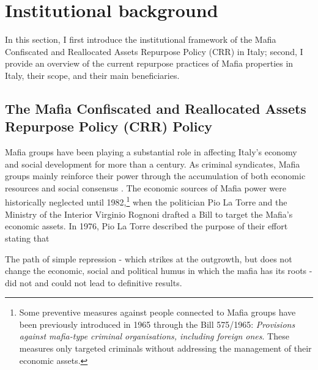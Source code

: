 \documentclass[12pt]{article}
\theoremstyle{plain}
\theoremstyle{plain}
\theoremstyle{plain}
\theoremstyle{definition}
\theoremstyle{plain}
\theoremstyle{definition}
\theoremstyle{plain}
\theoremstyle{remark}
\theoremstyle{definition}
\theoremstyle{definition}
\theoremstyle{plain}
\begin{document}
\section{Institutional background}
\label{sec:jmp_inst_bg}
In this section, I first introduce the institutional framework of the Mafia Confiscated and Reallocated Assets Repurpose Policy (CRR) in Italy; second, I provide an overview of the current repurpose practices of Mafia properties in Italy, their scope, and their main beneficiaries. \par
\FloatBarrier
\subsection{The Mafia Confiscated and Reallocated Assets Repurpose Policy (CRR) Policy}
\label{sec:jmp_crr_policy}
Mafia groups have been playing a substantial role in affecting Italy's economy and social development for more than a century. As criminal syndicates, Mafia groups mainly reinforce their power through the accumulation of both economic resources and social consensus \citep{sciarrone_il_1998}. 
The economic sources of Mafia power were historically neglected until 1982,\footnote{Some preventive measures against people connected to Mafia groups have been previously introduced in 1965 through the Bill 575/1965: \emph{Provisions against mafia-type criminal organisations, including foreign ones}. These measures only targeted criminals without addressing the management of their economic assets.} when the politician Pio La Torre and the Ministry of the Interior Virginio Rognoni drafted a Bill to target the Mafia's economic assets. In 1976, Pio La Torre  described the purpose of their effort stating that \par
\vspace{0.3cm}
\small %
The path of simple repression - which strikes at the outgrowth, but does not change the economic, social and political humus in which the mafia has its roots - did not and could not lead to definitive results.
\vspace{0.3cm}
\end{document}
